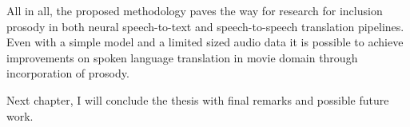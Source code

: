 All in all, the proposed methodology paves the way for research for inclusion prosody in both neural speech-to-text and speech-to-speech translation pipelines. Even with a simple model and a limited sized audio data it is possible to achieve improvements on spoken language translation in movie domain through incorporation of prosody. 

Next chapter, I will conclude the thesis with final remarks and possible future work. 